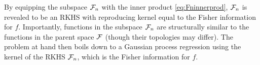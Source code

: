\documentclass[showframe,11pt,twoside,openright]{report}
\begin{document}
By equipping the subspace ${\mathcal F}_n$ with the inner product \cref{eq:Fninnerprod}, ${\mathcal F}_n$ is revealed to be an RKHS with reproducing kernel equal to the Fisher information for $f$.
Importantly, functions in the subspace ${\mathcal F}_n$ are structurally similar to the functions in the parent space ${\mathcal F}$ (though their topologies may differ).
The problem at hand then boils down to a Gaussian process regression using the kernel of the RKHS ${\mathcal F}_n$, which is the Fisher information for $f$.

\hClosingStuffStandalone
\end{document}
